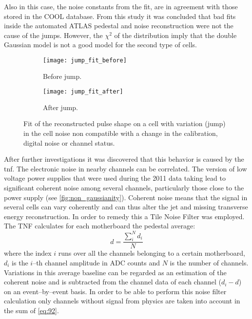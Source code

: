 Also in this case, the noise constants from the fit, are in agreement with those
stored in the COOL database. From this study it was concluded that bad fits
inside the automated ATLAS pedestal and noise reconstruction were not the cause
of the jumps. However, the $\chi^2$ of the distribution imply that the double
Gaussian model is not a good model for the second type of cells.
\begin{figure}[!h]
  \centering
  \begin{subfigure}[t]{.8\linewidth}
    \texttt{[image: jump\_fit\_before]}
    \caption{Before jump.}
    \label{fig:jump_fit_before}
  \end{subfigure}

  \begin{subfigure}[t]{.8\linewidth}
    \texttt{[image: jump\_fit\_after]}
    \caption{After jump.}
    \label{fig:jump_fit_after}
  \end{subfigure}
  \caption{Fit of the reconstructed pulse shape on a cell with variation (jump)
    in the cell noise non compatible with a change in the calibration, digital
    noise or channel status.}
  \label{fig:jump_fit}
\end{figure}

After further investigations it was discovered that this behavior is caused by
the \gls{tnf}. The electronic noise in nearby channels can be correlated. The
version of low voltage power supplies that were used during the 2011 data taking
lead to significant coherent noise among several channels, particularly those
close to the power supply (see \cref{fig:non_gaussianity}). Coherent noise means
that the signal in several cells can vary coherently and can thus alter the jet
and missing transverse energy reconstruction. In order to remedy this a Tile
Noise Filter was employed. The TNF calculates for each motherboard the pedestal
average:
\begin{equation}
  \label{eq:92}
  d = \frac{\sum_i^N d_i}{N}
\end{equation}
where the index $i$ runs over all the channels belonging to a certain
motherboard, $d_i$ is the $i$--th channel amplitude in ADC counts and $N$ is the
number of channels. Variations in this average baseline can be regarded as an
estimation of the coherent noise and is subtracted from the channel data of each
channel ($d_i - d$) on an event--by--event basis. In order to be able to perform
this noise filter calculation only channels without signal from physics are
taken into account in the sum of \cref{eq:92}.

